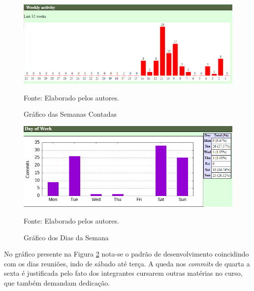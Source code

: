 \documentclass[
    12pt,               %
    openright,          %
    oneside,
    a4paper,            %
    BIBLATEX,           %
    TODO,               %
    english,            %
    brazil              %
    ]{ifsp-spo-inf-ctds}
\begin{document}
    \begin{figure}[H]
            \centering
            \caption{Gráfico das Semanas Contadas}
            \includegraphics[width=1 \textwidth]{Gitstats/documento/semanas contadas.png}
            \label{fig:semanas contadas}
            \centering
                
        \footnotesize Fonte: Elaborado pelos autores.
    \end{figure}
    
    \begin{figure}[H]
            \centering
            \caption{Gráfico dos Dias da Semana}
            \includegraphics[width=1 \textwidth]{Gitstats/documento/dias da semana.png}
                
            \label{fig:diadasemana}
            \centering
            \footnotesize Fonte: Elaborado pelos autores.
    \end{figure} 

    No gráfico presente na Figura \ref{fig:diadasemana} nota-se o padrão de desenvolvimento coincidindo com os dias reuniões, indo de sábado até terça. A queda nos \emph{commits} de quarta a sexta é justificada pelo fato dos integrantes cursarem outras matérias no curso, que também demandam dedicação.
    
\end{document}
